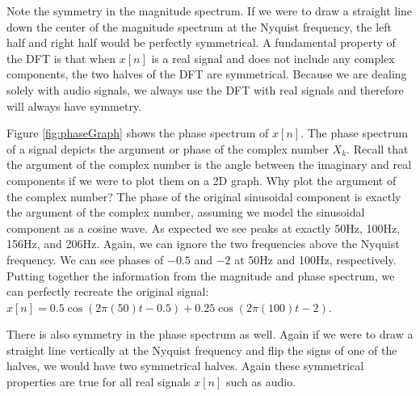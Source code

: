 Note the symmetry in the magnitude spectrum.  If we were to draw a straight line down the center of the 
magnitude spectrum at the Nyquist frequency, the left half and right half would be perfectly symmetrical.  
A fundamental property of the DFT is that when $x[n]$ is a real signal and does not include any complex
components, the two halves of the DFT are symmetrical.  Because we are dealing solely with audio signals,
we always use the DFT with real signals and therefore will always have symmetry.  

Figure \ref{fig:phaseGraph} shows the phase spectrum of $x[n]$.  The phase spectrum of a signal depicts
the argument or phase of the complex number $X_k$.  Recall that the argument of the complex number is 
the angle
between the imaginary and real components if we were to plot them on a 2D graph.  Why plot the argument
of the complex number?  The phase of the original sinusoidal
component is exactly the argument of the complex number, assuming we model the sinusoidal component 
as a cosine wave.  As expected we see peaks at exactly 50Hz, 100Hz, 156Hz, and 206Hz.  Again, we can 
ignore the two frequencies above the Nyquist frequency.  We can see phases of $-0.5$ and $-2$ at 50Hz and 
100Hz, respectively.  Putting together the information from the magnitude and
phase spectrum, we can perfectly recreate the original signal: 
$x[n] = 0.5\cos(2\pi(50)t - 0.5) + 0.25\cos(2\pi(100)t - 2)$.

There is also symmetry in the phase spectrum as well.  Again if we were to draw a straight line vertically at
the Nyquist frequency and flip the signs of one of the halves, we would have two symmetrical halves.  Again
these symmetrical properties are true for all real signals $x[n]$ such as audio.
